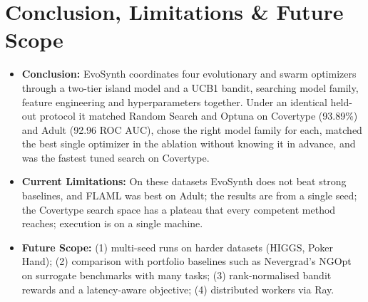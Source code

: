 \documentclass[11pt, a4paper]{article}
\begin{document}
\section{Conclusion, Limitations \& Future Scope}
\begin{itemize}[noitemsep, topsep=2pt]
    \item \textbf{Conclusion:} EvoSynth coordinates four evolutionary and swarm optimizers through a two-tier island model and a UCB1 bandit, searching model family, feature engineering and hyperparameters together. Under an identical held-out protocol it matched Random Search and Optuna on Covertype (93.89\%) and Adult (92.96 ROC AUC), chose the right model family for each, matched the best single optimizer in the ablation without knowing it in advance, and was the fastest tuned search on Covertype.
    \item \textbf{Current Limitations:} On these datasets EvoSynth does not beat strong baselines, and FLAML was best on Adult; the results are from a single seed; the Covertype search space has a plateau that every competent method reaches; execution is on a single machine.
    \item \textbf{Future Scope:} (1) multi-seed runs on harder datasets (HIGGS, Poker Hand); (2) comparison with portfolio baselines such as Nevergrad's NGOpt \cite{meunier2022blackbox} on surrogate benchmarks with many tasks; (3) rank-normalised bandit rewards and a latency-aware objective; (4) distributed workers via Ray.
\end{itemize}

\end{document}
